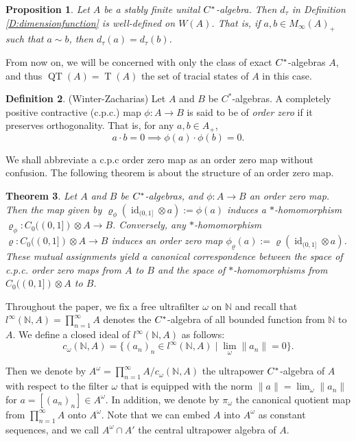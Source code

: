 \documentclass[12pt]{amsart}
\theoremstyle{plain}
\newtheorem{thm}{Theorem}[section]
\newtheorem{prop}[thm]{Proposition}
\theoremstyle{definition}
\newtheorem{defn}[thm]{Definition}
\def\id{\operatorname{id}}
\def\QT{\operatorname{QT}}
\def\T{\operatorname{T}}
\numberwithin{equation}{section}
\begin{document}
\begin{prop}
Let $A$ be a stably finite unital $C\sp*$-algebra. Then $d_{\tau}$ in Definition \ref{D:dimensionfunction} is well-defined on $W(A)$. That is, if $a, b \in M_{\infty}(A)_{+}$ such that $a \sim b$, then $d_{\tau}(a)=d_{\tau}(b)$. 
\end{prop}
From now on, we will be concerned with only the class of exact $C\sp*$-algebras $A$,  and thus $\QT(A)=\T(A)$ the set of tracial states of $A$ in this case. \\  
\begin{defn}(Winter-Zacharias)
Let $A$ and $B$ be $C^*$-algebras. A completely positive contractive (c.p.c.) map $\phi: A \to B$ is said to be of \textit{order zero} if it preserves orthogonality. That is, for any $a, b \in A_+$,
\[ a \cdot b = 0 \implies \phi(a) \cdot \phi(b) = 0. \]
\end{defn}
We shall abbreviate a c.p.c order zero map as an order zero map without confusion. The following theorem is about the structure of an order zero map. 

\begin{thm} \cite[Corollary 4.1]{WZ}\label{T:semiprojective}
Let $A$ and $B$ be $C\sp*$-algebras, and $\phi:A \to B$ an order zero map. Then the map given by $\varrho_{\phi} (\id_{(0,1]}\otimes a):=\phi(a)$ induces a $*$-homomorphism $\varrho_{\phi}:C_0((0,1])\otimes A \to B$. Conversely, any $*$-homomorphism $\varrho:C_0((0,1])\otimes A \to B$ induces an order zero map 
$\phi_{\varrho}(a):=\varrho(\id_{(0,1]}\otimes a)$.\\
These mutual  assignments yield a canonical correspondence between the space of c.p.c. order zero maps from $A$ to $B$  and the space of $*$-homomorphisms from $C_0((0,1])\otimes A $ to $B$.
\end{thm}


Throughout the paper, we fix a free ultrafilter $\omega$ on $\mathbb{N}$ and recall that  
$l^{\infty}(\mathbb{N}, A)=\prod_{n=1}^{\infty} A$ denotes  the $C\sp*$-algebra of  all bounded function from $\mathbb{N}$  to  $A$. We define a closed ideal of $l^{\infty}(\mathbb{N}, A)$ as follows: 
\[c_{\omega}(\mathbb{N}, A)=\{(a_n)_n \in l^{\infty}(\mathbb{N}, A)  \mid \lim_{\omega}\|a_n \|=0 \}. \]

Then we denote by $A^{\omega}=\prod_{n=1}^{\infty} A /c_{\omega}(\mathbb{N}, A)$ the ultrapower $C\sp*$-algebra of $A$  with respect to the filter $\omega$ that is  equipped with the norm  $\|a\|= \lim_{\omega} \|a_n\| $ for $a=[(a_n)_n] \in A^{\omega}$. In addition, we denote by $\pi_{\omega}$ the canonical quotient map from $\prod_{n=1}^{\infty} A$  onto $A^{\omega}$. Note that we can embed $A$ into $A^{\omega}$ as constant sequences, and we call $A^{\omega} \cap A'$ the central ultrapower algebra of $A$. 
\end{document}
